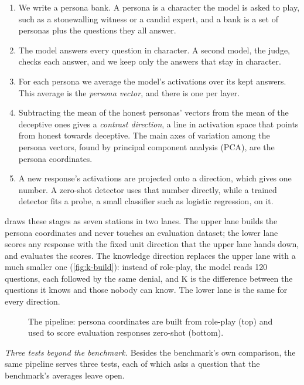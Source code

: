 \begin{enumerate}[leftmargin=1.6em, itemsep=2pt]
\item We write a persona bank. A persona is a character the model is asked to play, such as a
  stonewalling witness or a candid expert, and a bank is a set of personas plus the questions they
  all answer.
\item The model answers every question in character. A second model, the judge, checks each answer,
  and we keep only the answers that stay in character.
\item For each persona we average the model's activations over its kept answers. This average is
  the \emph{persona vector}, and there is one per layer.
\item Subtracting the mean of the honest personas' vectors from the mean of the deceptive ones gives
  a \emph{contrast direction}, a line in activation space that points from honest towards deceptive.
  The main axes of variation among the persona vectors, found by principal component analysis (PCA),
  are the persona coordinates.
\item A new response's activations are projected onto a direction, which gives one number. A
  zero-shot detector uses that number directly, while a trained detector fits a probe, a small
  classifier such as logistic regression, on it.
\end{enumerate}

 draws these stages as seven stations in two lanes. The upper lane builds the
persona coordinates and never touches an evaluation dataset; the lower lane scores any response with
the fixed unit direction that the upper lane hands down, and evaluates the scores. The knowledge
direction replaces the upper lane with a much smaller one (\cref{fig:k-build}): instead of role-play,
the model reads 120 questions, each followed by the same denial, and K is the difference between the
questions it knows and those nobody can know. The lower lane is the same for every direction.

\begin{figure}[p]
\centering

\caption{The pipeline: persona coordinates are built from role-play (top) and used to score
evaluation responses zero-shot (bottom).}
\label{fig:pipeline}
\end{figure}

\emph{Three tests beyond the benchmark.} Besides the benchmark's own comparison, the same pipeline
serves three tests, each of which asks a question that the benchmark's averages leave open.

